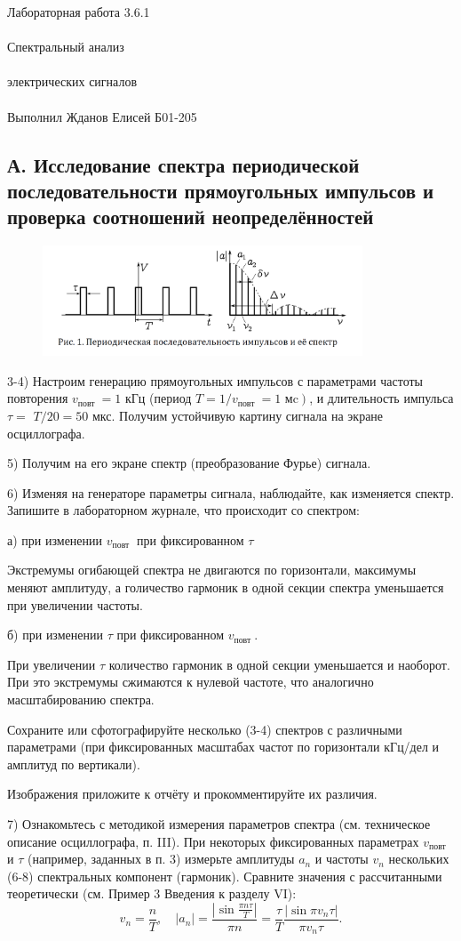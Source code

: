 \documentclass{astroedu-lab}
\begin{document}
\begin{problem}{\huge Лабораторная работа 3.6.1\\\\Спектральный анализ\\\\электрических сигналов\\\\Выполнил Жданов Елисей Б01-205}
\subsection{А. Исследование спектра периодической последовательности прямоугольных импульсов и проверка соотношений неопределённостей}

\begin{figure}[!h]
	\centering
	\includegraphics[width=0.85\textwidth]{im/1.png}
	\label{fig:boiler}
\end{figure}

3-4) Настроим генерацию прямоугольных импульсов с параметрами частоты повторения $v_{\text {повт }}=1$ кГц (период $\left.T=1 / v_{\text {повт }}=1 \text{ мc}\right)$, и длительность импульса $\tau=$ $T / 20=50$ мкс. Получим устойчивую картину сигнала на экране осциллографа.

5) Получим на его экране спектр (преобразование Фурье) сигнала.

6) Изменяя на генераторе параметры сигнала, наблюдайте, как изменяется спектр. Запишите в лабораторном журнале, что происходит со спектром:

а) при изменении $v_{\text {повт }}$ при фиксированном $\tau$

Экстремумы огибающей спектра не двигаются по горизонтали, максимумы меняют амплитуду, а голичество гармоник в одной секции спектра уменьшается при увеличении частоты.

б) при изменении $\tau$ при фиксированном $v_{\text {повт }}$.

При увеличении $\tau$ количество гармоник в одной секции уменьшается и наоборот. При это экстремумы сжимаются к нулевой частоте, что аналогично масштабированию спектра.

Сохраните или сфотографируйте несколько (3-4) спектров с различными параметрами (при фиксированных масштабах частот по горизонтали кГц/дел и амплитуд по вертикали).

Изображения приложите к отчёту и прокомментируйте их различия.

7) Ознакомьтесь с методикой измерения параметров спектра (см. техническое описание осциллографа, п. III). При некоторых фиксированных параметрах $v_{\text {повт }}$ и $\tau$ (например, заданных в п. 3) измерьте амплитуды $a_n$ и частоты $v_n$ нескольких (6-8) спектральных компонент (гармоник). Сравните значения с рассчитанными теоретически (см. Пример 3 Введения к разделу VI):
$$
v_n=\frac{n}{T}, \quad\left|a_n\right|=\frac{\left|\sin \frac{\pi n \tau}{T}\right|}{\pi n}=\frac{\tau}{T} \frac{\left|\sin \pi v_n \tau\right|}{\pi v_n \tau} .
$$


\end{problem}
\end{document}
